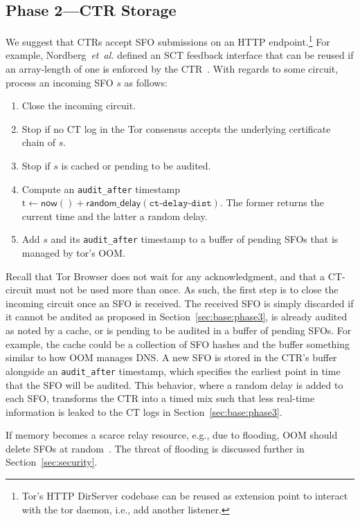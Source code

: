 \subsection{Phase 2---CTR Storage} \label{sec:base:phase2}
We suggest that CTRs accept SFO submissions on an HTTP endpoint.\footnote{%
	Tor's HTTP DirServer codebase can be reused as extension point to interact
	with the tor daemon, i.e., add another listener.
} For example, Nordberg~\emph{et~al.} defined an SCT feedback interface that can
be reused if an array-length of one is enforced by the CTR~\cite{nordberg}.
With regards to some circuit, process an incoming SFO $s$ as follows:
\begin{enumerate}
	\item\label{enm:ctr-api:close} Close the incoming circuit.
	\item\label{enm:ctr-api:unrecognized} Stop if no CT log in the Tor consensus
		accepts the underlying certificate chain of $s$.
	\item\label{enm:ctr-api:cached}
		Stop if $s$ is cached or pending to be audited.
	\item\label{enm:ctr-api:audit-after} Compute an \texttt{audit\_after}
		timestamp $\textrm{t} \gets \mathsf{now()} +
			\mathsf{random\_delay}(\texttt{ct-delay-dist})$.
		The former returns the current time and the latter a random delay.
	\item\label{enm:ctr-api:store}
		Add $s$ and its \texttt{audit\_after} timestamp to a buffer of
		pending SFOs that is managed by tor's OOM.
\end{enumerate}

Recall that Tor Browser does not wait for any acknowledgment, and that a
CT-circuit must not be used more than once.  As such, the first step is to
close the incoming circuit once an SFO is received.  The received SFO is
simply discarded if it
	cannot be audited as proposed in Section~\ref{sec:base:phase3},
	is already audited as noted by a cache, or
	is pending to be audited in a buffer of pending SFOs.
For example, the cache could be a collection of SFO hashes and the buffer
something similar to how OOM manages DNS.  A new SFO is stored in the CTR's
buffer alongside an \texttt{audit\_after} timestamp, which specifies the
earliest point in time that the SFO will be audited.  This behavior, where a
random delay is added to each SFO, transforms the CTR into a timed mix such that
less real-time information is leaked to the CT logs in
Section~\ref{sec:base:phase3}.

If memory becomes a scarce relay resource, e.g., due to flooding, OOM
should delete SFOs at random~\cite{nordberg}.  The threat of flooding is
discussed further in Section~\ref{sec:security}.

